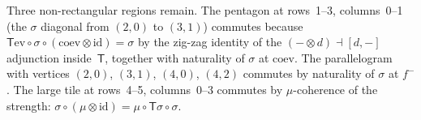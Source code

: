 \documentclass[11pt]{article}
\theoremstyle{definition}
\newcommand{\id}{\mathrm{id}}
\newcommand{\inpt}[1]{#1^{-}}
\newcommand{\ev}{\mathrm{ev}}
\newcommand{\coev}{\mathrm{coev}}
\newcommand{\Fun}[1]{\textsf{#1}}
\newcommand{\ihom}[2]{[#1,#2]}
\begin{document}
Three non-rectangular regions remain. The pentagon at rows~1--3, columns~0--1 (the $\sigma$ diagonal from $(2{,}0)$ to $(3{,}1)$) commutes because $\Fun{T}\ev\circ\sigma\circ(\coev\otimes\id)=\sigma$ by the zig-zag identity of the $({-}\otimes d)\dashv\ihom{d}{{-}}$ adjunction inside~$\Fun{T}$, together with naturality of $\sigma$ at $\coev$. The parallelogram with vertices $(2{,}0)$, $(3{,}1)$, $(4{,}0)$, $(4{,}2)$ commutes by naturality of $\sigma$ at $\inpt{f}$. The large tile at rows~4--5, columns~0--3 commutes by $\mu$-coherence of the strength: $\sigma\circ(\mu\otimes\id)=\mu\circ\Fun{T}\sigma\circ\sigma$.
\end{document}
